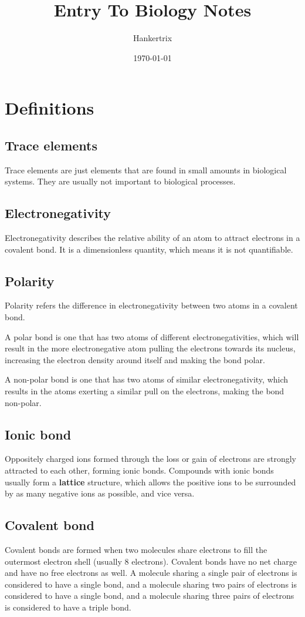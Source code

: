\documentclass[11pt]{article}
\author{Hankertrix}
\date{\today}
\title{Entry To Biology Notes}
\begin{document}
\maketitle
\setcounter{tocdepth}{2}
\tableofcontents \clearpage\newpage
\section{Definitions}
\label{sec:org90b393e}

\subsection{Trace elements}
\label{sec:org348e56c}
Trace elements are just elements that are found in small amounts in biological systems. They are usually not important to biological processes.
\subsection{Electronegativity}
\label{sec:org3667862}
Electronegativity describes the relative ability of an atom to attract electrons in a covalent bond. It is a dimensionless quantity, which means it is not quantifiable.
\subsection{Polarity}
\label{sec:orgefc1537}
Polarity refers the difference in electronegativity between two atoms in a covalent bond.


A polar bond is one that has two atoms of different electronegativities, which will result in the more electronegative atom pulling the electrons towards its nucleus, increasing the electron density around itself and making the bond polar.


A non-polar bond is one that has two atoms of similar electronegativity, which results in the atoms exerting a similar pull on the electrons, making the bond non-polar.
\subsection{Ionic bond}
\label{sec:org9e7b166}
Oppositely charged ions formed through the loss or gain of electrons are strongly attracted to each other, forming ionic bonds. Compounds with ionic bonds usually form a \textbf{lattice} structure, which allows the positive ions to be surrounded by as many negative ions as possible, and vice versa.
\subsection{Covalent bond}
\label{sec:org152e074}
Covalent bonds are formed when two molecules share electrons to fill the outermost electron shell (usually 8 electrons). Covalent bonds have no net charge and have no free electrons as well. A molecule sharing a single pair of electrons is considered to have a single bond, and a molecule sharing two pairs of electrons is considered to have a single bond, and a molecule sharing three pairs of electrons is considered to have a triple bond.
\end{document}
